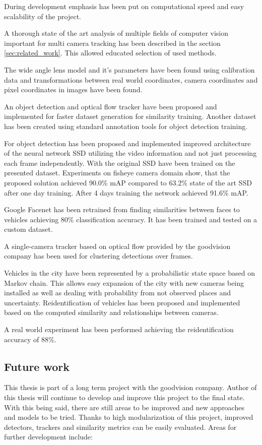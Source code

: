 \documentclass[a4paper,12pt,titlepage, twoside]{article}
\numberwithin{figure}{section}
\begin{document}
During development emphasis has been put on computational speed and easy scalability of the project.

A thorough state of the art analysis of multiple fields of computer vision important for multi camera tracking has been described in the section \ref{sec:related_work}. This allowed educated selection of used methods.

The wide angle lens model and it's parameters have been found using calibration data and transformations between real world coordinates, camera coordinates and pixel coordinates in images have been found.

An object detection and optical flow tracker have been proposed and implemented for faster dataset generation for similarity training. Another dataset has been created using standard annotation tools for object detection training.

For object detection has been proposed and implemented improved architecture of the neural network SSD \cite{liu2016ssd} utilizing the video information and not just processing each frame independently. With the original SSD have been trained on the presented dataset. Experiments on fisheye camera domain show, that the proposed solution achieved 90.0\% mAP compared to 63.2\% state of the art SSD\cite{liu2016ssd} after one day training. After 4 days training the network achieved 91.6\% mAP.

Google Facenet \cite{schroff2015facenet} has been retrained from finding similarities between faces to vehicles achieving 80\% classification accuracy. It has been trained and tested on a custom dataset.

A single-camera tracker based on optical flow provided by the goodvision company has been used for clustering detections over frames.

Vehicles in the city have been represented by a probabilistic state space based on Markov chain. This allows easy expansion of the city with new cameras being installed as well as dealing with probability from not observed places and uncertainty. Reidentification of vehicles has been proposed and implemented based on the computed similarity and relationships between cameras.

A real world experiment has been performed achieving the reidentification accuracy of 88\%.

\subsection{Future work}
This thesis is part of a long term project with the goodvision company. Author of this thesis will continue to develop and improve this project to the final state. With this being said, there are still areas to be improved and new approaches and models to be tried. Thanks to high modularization of this project, improved detectors, trackers and similarity metrics can be easily evaluated. Areas for further development include:
\end{document}
